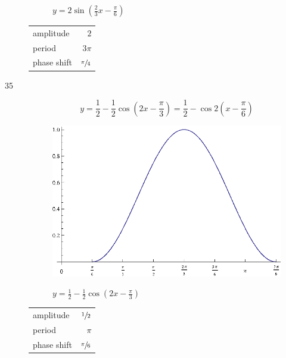 \documentclass{exam}
\begin{document}
\begin{description}
\begin{figure}[H]
          $y = 2 \sin \left( \frac{2}{3} x - \frac{\pi}{6} \right)$
        \end{figure}

        \begin{tabular}[H]{lr}
          \toprule
          amplitude   & $2$ \\
          period      & $3 \pi$ \\
          phase shift & $\sfrac{\pi}{4}$ \\
          \bottomrule
        \end{tabular}

      \pagebreak

      \item[35]
        \[
          y = \frac{1}{2} - \frac{1}{2} \cos \left( 2x - \frac{\pi}{3} \right) = \frac{1}{2} - \cos 2 \left( x - \frac{\pi}{6} \right)
        \]

        \begin{figure}[H]
          \centering
          \includegraphics[scale=1.0]{exercise35.eps}

          $y = \frac{1}{2} - \frac{1}{2} \cos \left( 2x - \frac{\pi}{3} \right)$
        \end{figure}

        \begin{tabular}[H]{lr}
          \toprule
          amplitude   & $\sfrac{1}{2}$ \\
          period      & $\pi$ \\
          phase shift & $\sfrac{\pi}{6}$ \\
          \bottomrule
        \end{tabular}

      \pagebreak


\end{description}
\end{document}
